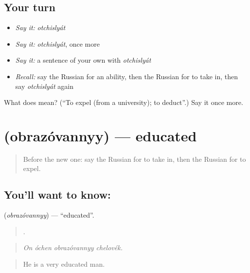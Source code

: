 \subsection*{Your turn}
\begin{itemize}
\raggedright
  \item \emph{Say it:} \emph{otchislyát}
  \item \emph{Say it:} \emph{otchislyát}, once more
  \item \emph{Say it:} a sentence of your own with \emph{otchislyát}
  \item \emph{Recall:} say the Russian for an ability, then the Russian for to take in, then say \emph{otchislyát} again
\end{itemize}

\begin{tcolorbox}[breakable,colback=teal!4,colframe=teal!35!black,title={Before you move on}]
What does  mean? (\textquotedblleft{}To expel (from a university); to deduct\textquotedblright{}.) Say it once more.
\end{tcolorbox}
\section[\texorpdfstring{\ru{образованный} (obrazóvannyy)}{образованный (obrazóvannyy)}]{ (obrazóvannyy) — educated}

\label{lesson:RU-C387-obrazovannyy}



\begin{quote}
Before the new one: say the Russian for to take in, then the Russian for to expel.
\end{quote}

\subsection*{You'll want to know: }
\textbf{} (\emph{obrazóvannyy}) — \textquotedblleft{}educated\textquotedblright{}.

\begin{quote}
   .
\end{quote}

\begin{quote}
\emph{On óchen obrazóvannyy chelovék.}
\end{quote}

\begin{quote}
He is a very educated man.
\end{quote}

